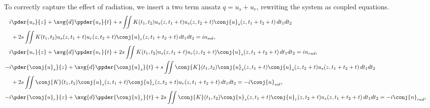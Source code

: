 To correctly capture the effect of radiation, we insert a two term ansatz $q = u_s+u_r$, 
rewriting the system as coupled equations.
\begin{equation}\label{equ:coupled_DMNLSE}
\begin{split}
i&\pder{u_s}{z} + \avg{d} \ppder{u_s}{t} +  s \iint K(t_1,t_2)  u_s(z,t_1+t) u_s(z,t_2+t) \conj{u}_s(z,t_1+t_2+t)  \,dt_1 dt_2 \\
&+ 2 s\iint K(t_1,t_2)  u_s(z,t_1+t) u_r(z,t_2+t) \conj{u}_r(z,t_1+t_2+t)  \,dt_1 dt_2 = in_{sol}, \\
i&\pder{u_r}{z} + \avg{d} \ppder{u_r}{t} + 2 s\iint K(t_1,t_2) u_s(z,t_1+t) u_r(z,t_2+t) \conj{u}_s(z,t_1+t_2+t)   \,dt_1 dt_2 = in_{rad}, \\
-i&\pder{\conj{u}_s}{z} + \avg{d}\ppder{\conj{u}_s}{t} + s \iint \conj{K}(t_1,t_2)  \conj{u}_s(z,t_1+t) \conj{u}_s(z,t_2+t) u_s(z,t_1+t_2+t)  \,dt_1 dt_2 \\
&+ 2s \iint \conj{K}(t_1,t_2) \conj{u}_s(z,t_1+t) \conj{u}_r(z,t_2+t) u_r(z,t_1+t_2+t)   \,dt_1 dt_2 = -i\conj{n}_{sol}, \\
-i&\pder{\conj{u}_r}{z} + \avg{d}\ppder{\conj{u}_r}{t} + 2 s\iint \conj{K}(t_1,t_2)  \conj{u}_s(z,t_1+t) \conj{u}_r(z,t_2+t) u_s(z,t_1+t_2+t)  \,dt_1 dt_2 = -i\conj{n}_{rad}, \\
\end{split}
\end{equation}

